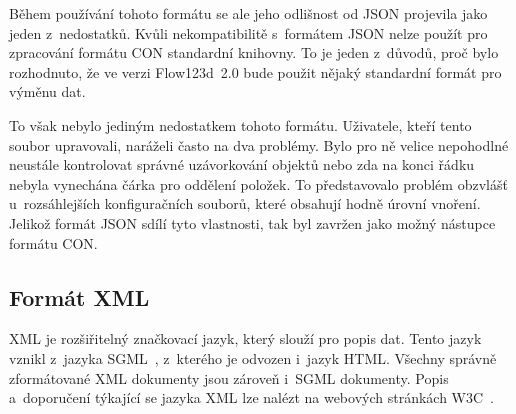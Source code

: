 \documentclass[FM,bw,DP]{tulthesis}
\begin{document}
Během používání tohoto formátu se ale jeho odlišnost od \gls{JSON} projevila jako jeden z~nedostatků. Kvůli nekompatibilitě s~formátem \gls{JSON} nelze použít pro zpracování formátu \gls{CON} standardní knihovny. To je jeden z~důvodů, proč bylo rozhodnuto, že ve verzi Flow123d~2.0 bude použit nějaký standardní formát pro výměnu dat.

To však nebylo jediným nedostatkem tohoto formátu. Uživatele, kteří tento soubor upravovali, naráželi často na dva problémy. Bylo pro ně velice nepohodlné neustále kontrolovat správné uzávorkování objektů nebo zda na konci řádku nebyla vynechána čárka pro oddělení položek. To představovalo problém  obzvlášť u~rozsáhlejších konfiguračních souborů, které obsahují hodně úrovní vnoření. Jelikož formát \gls{JSON} sdílí tyto vlastnosti, tak byl zavržen jako možný nástupce formátu \gls{CON}.

\subsection{Formát XML}

\gls{XML} je rozšiřitelný značkovací jazyk, který slouží pro popis dat. Tento jazyk vznikl z~jazyka \gls{SGML}~\cite{bib:sgml-iso}, z~kterého je odvozen i~jazyk \gls{HTML}. Všechny správně zformátované \gls{XML} dokumenty jsou zároveň i~\gls{SGML} dokumenty. Popis a~doporučení týkající se jazyka \gls{XML} lze nalézt na webových stránkách \gls{W3C}~\cite{bib:xml}.
\end{document}
